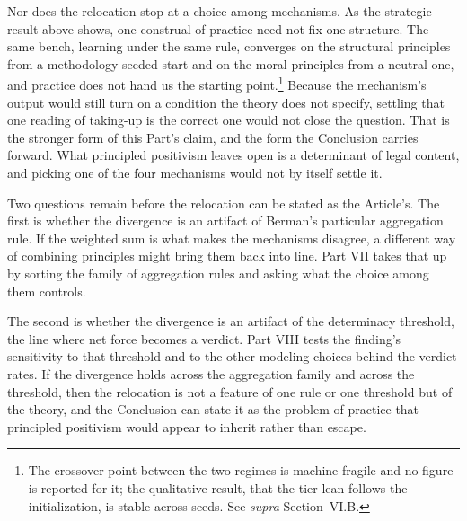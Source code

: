 Nor does the relocation stop at a choice among mechanisms. As the strategic result above shows, one construal of practice need not fix
one structure. The same bench, learning under the same rule, converges on the
structural principles from a methodology-seeded start and on the moral
principles from a neutral one, and practice does not hand us the starting
point.\footnote{The crossover point between the two regimes is
machine-fragile and no figure is reported for it; the qualitative result,
that the tier-lean follows the initialization, is stable across seeds.
See \textit{supra} Section~VI.B.} Because the mechanism's output would still turn on a condition the theory
does not specify, settling that one reading of taking-up is the correct one
would not close the question. That is the stronger form of this Part's claim, and the form the
Conclusion carries forward. What principled positivism leaves open is a
determinant of legal content, and picking one of the four mechanisms
would not by itself settle it.

Two questions remain before the relocation can be stated as the
Article's. The first is whether the divergence is an artifact of Berman's
particular aggregation rule. If the weighted sum is what makes the
mechanisms disagree, a different way of combining principles might bring
them back into line. Part VII takes that up by sorting the family of
aggregation rules and asking what the choice among them controls.

The second is whether the divergence is an
artifact of the determinacy threshold, the line where net force
becomes a verdict. Part VIII tests the finding's sensitivity to that
threshold and to the other modeling choices behind the verdict rates. If the divergence holds across the aggregation family and across
the threshold, then the relocation is not a feature of one rule or one threshold but of the
theory, and the Conclusion can state it as the problem of practice that
principled positivism would appear to inherit rather than escape.